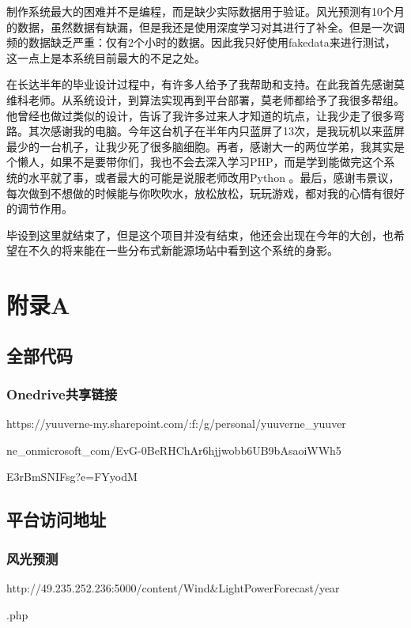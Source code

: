\documentclass[winfonts,UTF8,a4paper]{ctexart}
\begin{document}
制作系统最大的困难并不是编程，而是缺少实际数据用于验证。风光预测有10个月的数据，虽然数据有缺漏，但是我还是使用深度学习对其进行了补全。但是一次调频的数据缺乏严重：仅有2个小时的数据。因此我只好使用fakedata来进行测试，这一点上是本系统目前最大的不足之处。

在长达半年的毕业设计过程中，有许多人给予了我帮助和支持。在此我首先感谢莫维科老师。从系统设计，到算法实现再到平台部署，莫老师都给予了我很多帮组。他曾经也做过类似的设计，告诉了我许多过来人才知道的坑点，让我少走了很多弯路。其次感谢我的电脑。今年这台机子在半年内只蓝屏了13次，是我玩机以来蓝屏最少的一台机子，让我少死了很多脑细胞。再者，感谢大一的两位学弟，我其实是个懒人，如果不是要带你们，我也不会去深入学习PHP，而是学到能做完这个系统的水平就了事，或者最大的可能是说服老师改用Python
。最后，感谢韦景议，每次做到不想做的时候能与你吹吹水，放松放松，玩玩游戏，都对我的心情有很好的调节作用。

毕设到这里就结束了，但是这个项目并没有结束，他还会出现在今年的大创，也希望在不久的将来能在一些分布式新能源场站中看到这个系统的身影。
\newpage
\section*{附录A}
\subsection*{全部代码}

\subsubsection*{Onedrive共享链接}

https://yuuverne-my.sharepoint.com/:f:/g/personal/yuuverne\_yuuver

ne\_onmicrosoft\_com/EvG-0BeRHChAr6hjjwobb6UB9bAsaoiWWh5

E3rBmSNIFsg?e=FYyodM

\subsection*{平台访问地址}

\subsubsection*{风光预测}
http://49.235.252.236:5000/content/Wind\&LightPowerForecast/year

.php
\end{document}

